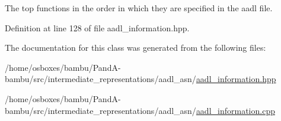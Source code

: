 The top functions in the order in which they are specified in the aadl file. 



Definition at line 128 of file aadl\+\_\+information.\+hpp.



The documentation for this class was generated from the following files\+:\begin{DoxyCompactItemize}
\item 
/home/osboxes/bambu/\+Pand\+A-\/bambu/src/intermediate\+\_\+representations/aadl\+\_\+asn/\hyperlink{aadl__information_8hpp}{aadl\+\_\+information.\+hpp}\item 
/home/osboxes/bambu/\+Pand\+A-\/bambu/src/intermediate\+\_\+representations/aadl\+\_\+asn/\hyperlink{aadl__information_8cpp}{aadl\+\_\+information.\+cpp}\end{DoxyCompactItemize}
